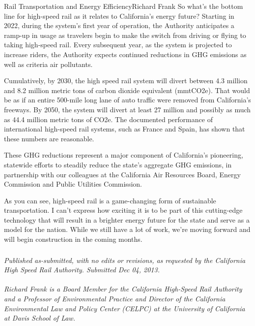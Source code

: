 \documentclass{papertex}
\begin{document}
\begin{news}{2}{Rail Transportation and Energy Efficiency}{Richard Frank}{}{}
So what’s the bottom line for high-speed rail as it relates to California’s 
energy future? Starting in 2022, during the system’s first year of operation, 
the Authority anticipates a ramp-up in usage as travelers begin to make the 
switch from driving or flying to taking high-speed rail. Every subsequent year, 
as the system is projected to increase riders, the Authority expects continued 
reductions in GHG emissions as well as criteria air pollutants.

Cumulatively, by 2030, the high speed rail system will divert between 4.3 
million and 8.2 million metric tons of carbon dioxide equivalent (mmtCO2e).  
That would be as if an entire 500-mile long lane of auto traffic were removed 
from California’s freeways.  By 2050, the system will divert at least 27 
million and possibly as much as 44.4 million metric tons of CO2e.  The 
documented performance of international high-speed rail systems, such as France 
and Spain, has shown that these numbers are reasonable.

These GHG reductions represent a major component of California’s pioneering, 
statewide efforts to steadily reduce the state’s aggregate GHG emissions, in 
partnership with our colleagues at the California Air Resources Board, Energy 
Commission and Public Utilities Commission.

As you can see, high-speed rail is a game-changing form of sustainable 
transportation. I can’t express how exciting it is to be part of this 
cutting-edge technology that will result in a brighter energy future for the 
state and serve as a model for the nation. While we still have a lot of work, 
we’re moving forward and will begin construction in the coming months.

\subsubsection*{}

\emph{Published as-submitted, with no edits or revisions, as requested by the 
California High Speed Rail Authority. Submitted Dec 04, 2013.}
\\
\\
\emph{Richard Frank is a Board Member for the California High-Speed Rail 
Authority and a Professor of Environmental Practice and Director of the 
California Environmental Law and Policy Center (CELPC) at the University of 
California at Davis School of Law.}

\end{news}
\end{document}
